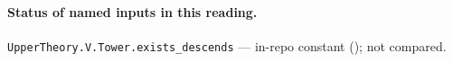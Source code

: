 

\paragraph{Status of named inputs in this reading.}
\noindent\nolinkurl{UpperTheory.V.Tower.exists_descends} --- in-repo constant (); not compared.\par

